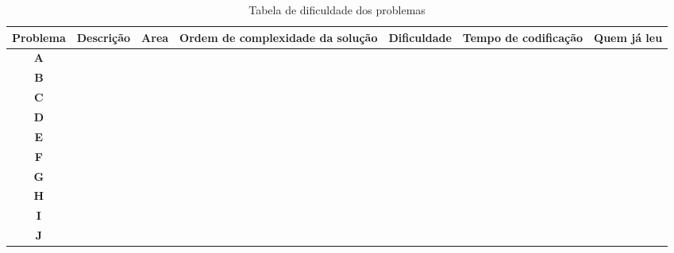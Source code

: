 \begin{table*}
\begin{tabular}{|c|c|c|c|c|c|c|}
\hline
\textbf{Problema} & \textbf{Descrição} & \textbf{Area} & \textbf{Ordem de complexidade da solução} & \textbf{Dificuldade} & \textbf{Tempo de codificação} & \textbf{Quem já leu} \\ \hline
\textbf{A} &  &  &  &  &  &  \\ \hline
\textbf{B} &  &  &  &  &  &  \\ \hline
\textbf{C} &  &  &  &  &  &  \\ \hline
\textbf{D} &  &  &  &  &  &  \\ \hline
\textbf{E} &  &  &  &  &  &  \\ \hline
\textbf{F} &  &  &  &  &  &  \\ \hline
\textbf{G} &  &  &  &  &  &  \\ \hline
\textbf{H} &  &  &  &  &  &  \\ \hline
\textbf{I} &  &  &  &  &  &  \\ \hline
\textbf{J} &  &  &  &  &  &  \\ \hline
\end{tabular}
\caption{Tabela de dificuldade dos problemas}
\label{problensTable}
\end{table*}
